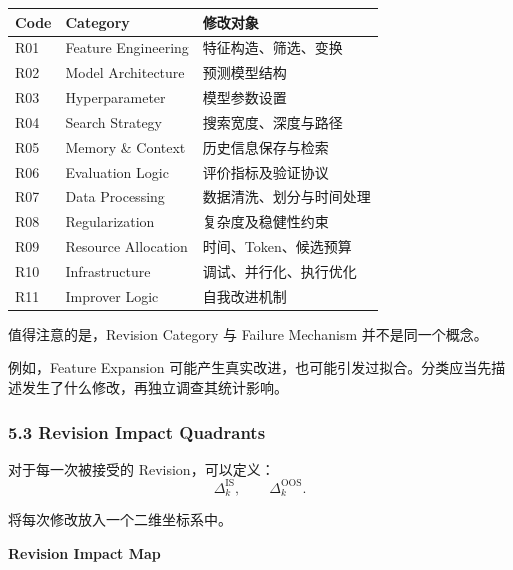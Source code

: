 \begin{readertable}
\begin{longtable}[]{@{}
  >{\raggedright\arraybackslash}p{}
  >{\raggedright\arraybackslash}p{}
  >{\raggedright\arraybackslash}p{}@{}}
\toprule
Code & Category & 修改对象 \\
\midrule
\endhead
R01 & Feature Engineering & 特征构造、筛选、变换 \\
R02 & Model Architecture & 预测模型结构 \\
R03 & Hyperparameter & 模型参数设置 \\
R04 & Search Strategy & 搜索宽度、深度与路径 \\
R05 & Memory \& Context & 历史信息保存与检索 \\
R06 & Evaluation Logic & 评价指标及验证协议 \\
R07 & Data Processing & 数据清洗、划分与时间处理 \\
R08 & Regularization & 复杂度及稳健性约束 \\
R09 & Resource Allocation & 时间、Token、候选预算 \\
R10 & Infrastructure & 调试、并行化、执行优化 \\
R11 & Improver Logic & 自我改进机制 \\
\bottomrule
\end{longtable}
\end{readertable}

值得注意的是，Revision Category 与 Failure Mechanism 并不是同一个概念。

例如，Feature Expansion 可能产生真实改进，也可能引发过拟合。分类应当先描述发生了什么修改，再独立调查其统计影响。

\hypertarget{part-3-48-0001-revision-impact-quadrants}{%
\subsubsection{5.3 Revision Impact Quadrants}\label{part-3-48-0001-revision-impact-quadrants}}

对于每一次被接受的 Revision，可以定义：
\[\Delta_k^{\mathrm{IS}},
\qquad
\Delta_k^{\mathrm{OOS}}.\]

将每次修改放入一个二维坐标系中。

\textbf{Revision Impact Map}


